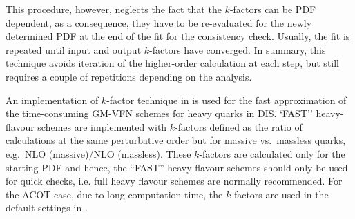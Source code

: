   This procedure, however, neglects the fact that the $k$-factors can be 
  PDF dependent, 
  as a consequence, they have to be re-evaluated
  for the newly determined PDF at the end of the fit for the consistency
  check. Usually, the fit is repeated until input and output
  $k$-factors have converged. In summary, this technique avoids
  iteration of the higher-order calculation at each step, but still
  requires a couple of repetitions depending on the analysis.


%
%

An implementation of $k$-factor technique in \fitter is used for the fast 
approximation of the time-consuming GM-VFN schemes for heavy quarks in DIS.
`FAST'' heavy-flavour schemes are implemented
with $k$-factors defined as the ratio of
calculations at the same perturbative order but for massive vs.\
massless quarks, e.g.\ NLO (massive)/NLO (massless).
These $k$-factors are calculated only for the
starting PDF and hence, the ``FAST'' heavy flavour schemes should
only be used for quick checks, i.e. full heavy flavour schemes
are normally recommended. For the ACOT case,
due to long computation time, the $k$-factors are used in 
the default settings in \fitter. 



